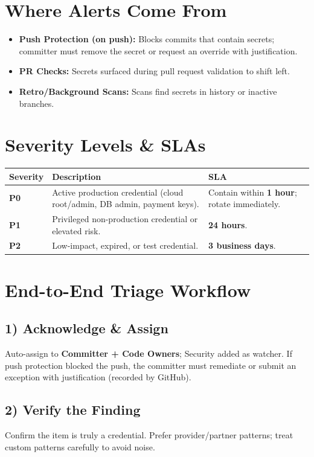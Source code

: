 \documentclass[11pt,a4paper]{article}
\begin{document}
\section{Where Alerts Come From}
\begin{itemize}[leftmargin=1.2em]
  \item \textbf{Push Protection (on push):} Blocks commits that contain secrets; committer must remove the secret or request an override with justification.
  \item \textbf{PR Checks:} Secrets surfaced during pull request validation to shift left.
  \item \textbf{Retro/Background Scans:} Scans find secrets in history or inactive branches.
\end{itemize}

\section{Severity Levels \& SLAs}
\begin{tabularx}{\linewidth}{@{}>{\raggedright\arraybackslash}p{6em} >{\raggedright\arraybackslash}X >{\raggedright\arraybackslash}p{8em}@{}}
\toprule
\textbf{Severity} & \textbf{Description} & \textbf{SLA} \\
\midrule
\textcolor{crit}{\textbf{P0}} & Active production credential (cloud root/admin, DB admin, payment keys). & Contain within \textbf{1 hour}; rotate immediately. \\
\textcolor{warn}{\textbf{P1}} & Privileged non-production credential or elevated risk. & \textbf{24 hours}. \\
\textcolor{ok}{\textbf{P2}} & Low-impact, expired, or test credential. & \textbf{3 business days}. \\
\bottomrule
\end{tabularx}
\clearpage

\section{End-to-End Triage Workflow}
\subsection*{1) Acknowledge \& Assign}
Auto-assign to \textbf{Committer + Code Owners}; Security added as watcher. If push protection blocked the push, the committer must remediate or submit an exception with justification (recorded by GitHub).

\subsection*{2) Verify the Finding}
Confirm the item is truly a credential. Prefer provider/partner patterns; treat custom patterns carefully to avoid noise.
\end{document}
